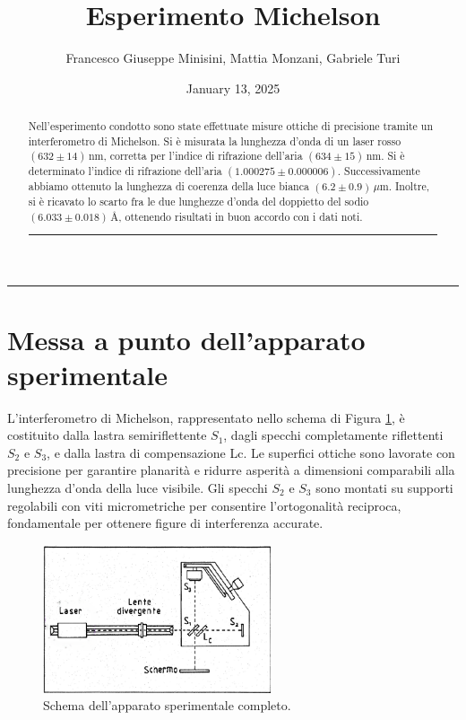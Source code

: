 \documentclass[a4paper,12pt]{article}
\title{Esperimento Michelson}
\author{Francesco Giuseppe Minisini, Mattia Monzani, Gabriele Turi}
\date{January 13, 2025}
\begin{document}
\maketitle
\hrule
\vspace{9pt}
\begin{abstract}
    \noindent
    Nell'esperimento condotto sono state effettuate misure ottiche di precisione tramite un interferometro di Michelson. Si è misurata la lunghezza d’onda di un laser rosso \((632 \pm 14)\,\text{nm}\), corretta per l’indice di rifrazione dell’aria \((634 \pm 15)\,\text{nm}\). Si è determinato l’indice di rifrazione dell’aria \((1.000275 \pm 0.000006)\). Successivamente abbiamo ottenuto la lunghezza di coerenza della luce bianca \((6.2 \pm 0.9)\,\mu\text{m}\). Inoltre, si è ricavato lo scarto fra le due lunghezze d’onda del doppietto del sodio \((6.033 \pm 0.018)\,\text{\AA}\), ottenendo risultati in buon accordo con i dati noti.
\vspace{20 pt}
\hrule
\end{abstract}
\vspace{2 pt}


\section{Messa a punto dell'apparato sperimentale}
L’interferometro di Michelson, rappresentato nello schema di Figura \ref{fig:apparato_completo}, è costituito dalla lastra semiriflettente \(S_1\), dagli specchi completamente riflettenti \(S_2\) e \(S_3\), e dalla lastra di compensazione Lc. Le superfici ottiche sono lavorate con precisione per garantire planarità e ridurre asperità a dimensioni comparabili alla lunghezza d’onda della luce visibile. Gli specchi \(S_2\) e \(S_3\) sono montati su supporti regolabili con viti micrometriche per consentire l’ortogonalità reciproca, fondamentale per ottenere figure di interferenza accurate.

\begin{figure}[H]
    \centering
    \includegraphics[width=0.6\textwidth]{Apparato2.png}
    \caption{Schema dell'apparato sperimentale completo.}
    \label{fig:apparato_completo}
\end{figure}
\end{document}
